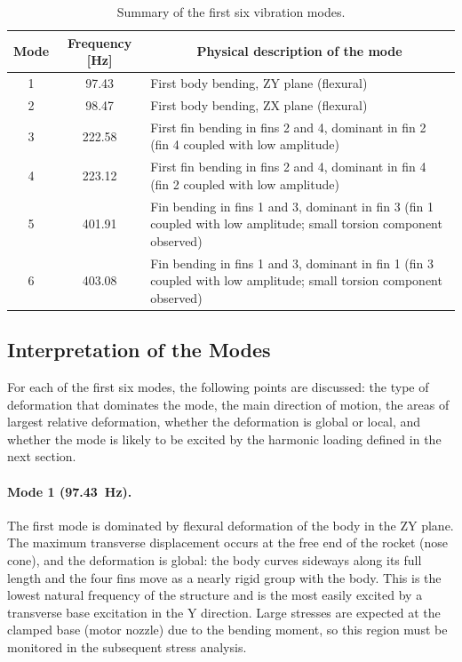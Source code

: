 \begin{table}[H]
\centering
\caption{Summary of the first six vibration modes.}
\label{tab:modes}
\small
\begin{tabular}{c c p{9.5cm}}
\toprule
\multicolumn{1}{c}{Mode} & \multicolumn{1}{c}{Frequency [\si{\hertz}]} & \multicolumn{1}{c}{Physical description of the mode} \\
\midrule
1 & 97.43  & First body bending, ZY plane (flexural) \\
2 & 98.47  & First body bending, ZX plane (flexural) \\
3 & 222.58 & First fin bending in fins 2 and 4, dominant in fin 2 (fin 4 coupled with low amplitude) \\
4 & 223.12 & First fin bending in fins 2 and 4, dominant in fin 4 (fin 2 coupled with low amplitude) \\
5 & 401.91 & Fin bending in fins 1 and 3, dominant in fin 3 (fin 1 coupled with low amplitude; small torsion component observed) \\
6 & 403.08 & Fin bending in fins 1 and 3, dominant in fin 1 (fin 3 coupled with low amplitude; small torsion component observed) \\
\bottomrule
\end{tabular}
\end{table}

\subsection{Interpretation of the Modes}
\label{sec:modal_interpretation}

For each of the first six modes, the following points are discussed: the type of deformation that dominates the mode, the main direction of motion, the areas of largest relative deformation, whether the deformation is global or local, and whether the mode is likely to be excited by the harmonic loading defined in the next section.

\paragraph{Mode 1 (\SI{97.43}{\hertz}).} The first mode is dominated by flexural deformation of the body in the ZY plane. The maximum transverse displacement occurs at the free end of the rocket (nose cone), and the deformation is global: the body curves sideways along its full length and the four fins move as a nearly rigid group with the body. This is the lowest natural frequency of the structure and is the most easily excited by a transverse base excitation in the Y direction. Large stresses are expected at the clamped base (motor nozzle) due to the bending moment, so this region must be monitored in the subsequent stress analysis.

